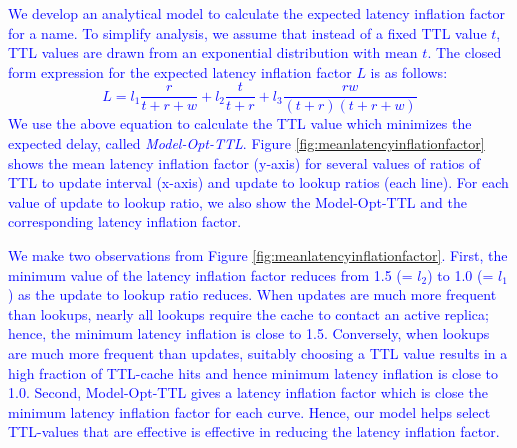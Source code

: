 \textcolor{blue}{
We develop an analytical model to calculate the expected latency inflation factor for a name. To simplify  analysis, we assume that instead of a fixed TTL value $t$, TTL values  are drawn from an exponential distribution with mean $t$. The closed form expression for the expected latency inflation factor $L$ is as follows:
\label{eqn:expected_delay}
\[L =  l_1 \frac{r}{t+r+w} + l_2\frac{ t}{t+r} +  l_3 \frac{rw}{(t+r)(t+r+w)}\]
}
\textcolor{blue}{
\noindent
We use the above equation to calculate the TTL value which minimizes the expected delay, called \emph{Model-Opt-TTL}.  Figure \ref{fig:meanlatencyinflationfactor} shows the mean latency inflation factor (y-axis) for several values of ratios of TTL to update interval (x-axis) and update to lookup ratios (each line).  For each value of update to lookup ratio, we also show the Model-Opt-TTL and the corresponding  latency inflation factor. 
}

\textcolor{blue}{
We make two observations from Figure \ref{fig:meanlatencyinflationfactor}. 
First, the minimum value of the latency inflation factor reduces from 1.5  (= $l_2$) to 1.0 (= $l_1$) as the update to lookup ratio reduces. When updates are much more frequent than lookups, nearly all lookups require the cache to contact an active replica; hence, the minimum latency inflation is close to 1.5.
Conversely, when lookups are much more frequent than updates, suitably choosing a TTL value results in a high fraction of TTL-cache hits and hence minimum latency inflation is close to 1.0. 
Second,  Model-Opt-TTL gives a latency inflation factor  which is close the minimum latency inflation factor for each curve. Hence, our model helps select TTL-values that are effective is effective in reducing the latency inflation factor.
}


